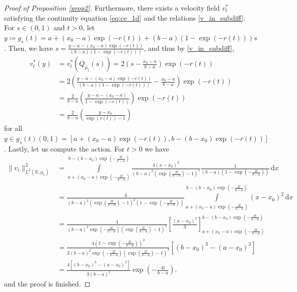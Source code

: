 \documentclass{article}
\newcommand{\R}{\mathbb{R}}
\renewcommand{\d}{\, \mathrm{d}}
\theoremstyle{plain}
\theoremstyle{definition}
\theoremstyle{remark}
\begin{document}
\begin{proof}[Proof of Proposition \ref{prop2}]
Furthermore, there exists a velocity field $v_t^*$ satisfying the continuity equation \eqref{eq:ce_1d} and the relations \eqref{v_in_subdiff}.
For $s \in (0, 1)$ and $t > 0$, let $y \coloneqq g_s(t) = a + (x_0 - a) \exp\left( - r(t)\right) + (b - a) \left(1 - \exp\left( - r(t)\right)\right) s$.
Then, we have $s = \frac{y - a - (x_0 - a) \exp\left( - r(t)\right)}{(b - a) \left(1 -\exp\left( - r(t)\right)\right)}$, and thus by \eqref{v_in_subdiff},
    \begin{align*}
        v_t^*(y)
        & = v_t^*(Q_{\mu_t}(s))
        = 2 \left(s - \frac{x_0 - a}{b - a} \right)\exp\left( - r(t)\right) \\
        & = 2 \left(\frac{y - a - (x_0 - a) \exp\left( - r(t)\right)}{(b - a) \left(1 -\exp\left( - r(t)\right)\right)} - \frac{x_0 - a}{b - a} \right)\exp\left( - r(t)\right) \\
        & = \frac{2}{b - a} \left(\frac{y - a - (x_0 - a)}{1 -\exp\left( - r(t)\right)} \right)\exp\left( - r(t)\right) \\
        & = \frac{2}{b - a} \left(\frac{y - x_0}{\exp\left(r(t)\right) - 1} \right) 
    \end{align*}
    for all $y \in g_s(t)(0,1) = \left[ a + (x_0 - a) \exp(-r(t)), b - (b - x_0) \exp\left(- r(t) \right) \right]$. 
    Lastly, let us compute the action.
    For $t > 0$ we have
    \begin{align}
        \| v_t \|_{L^2(\R,\mu_t)}^2
        & = \int\limits_{a + (x_0 - a) \exp\left( - \frac{2 t}{b - a}\right)}^{b - (b - x_0) \exp\left( - \frac{2 t}{b - a}\right)} \frac{4 (x - x_0)^2}{(b - a)^2 \left( \exp\left(\frac{2 t}{b - a}\right) - 1\right)^2} \frac{1}{(b - a) \left(1 - \exp\left(-\frac{2 t}{b - a}\right)\right)} \d{x} \\
        & = \frac{4}{(b - a)^3 \left( \exp\left(\frac{2 t}{b - a}\right) - 1\right)^2 \left(1 - \exp\left(-\frac{2 t}{b - a}\right)\right)} \int\limits_{a + (x_0 - a) \exp\left( - \frac{2 t}{b - a}\right)}^{b - (b - x_0) \exp\left( - \frac{2 t}{b - a}\right)} (x - x_0)^2 \d{x} \\
        & = \frac{4}{(b - a)^2 \exp\left(-\frac{2 t}{b - a}\right) \left(\exp\left(\frac{2 t}{b - a}\right) - 1\right)^3} \left[ \frac{(x - x_0)^3}{3} \right]_{a + (x_0 - a) \exp\left( - \frac{2 t}{b - a}\right)}^{b - (b - x_0) \exp\left( - \frac{2 t}{b - a}\right)} \\
        & = \frac{4 \left(1 - \exp\left( - \frac{2 t}{b - a}\right)\right)^3}{3 (b - a)^2 \exp\left(-\frac{2 t}{b - a}\right) \left(\exp\left(\frac{2 t}{b - a}\right) - 1\right)^3} \left[ (b - x_0)^3 - (a - x_0)^3 \right] \\
        & = \frac{4 \left[ (b - x_0)^3 - (a - x_0)^3 \right]}{3 (b - a)^2} \exp\left( - \frac{4 t}{b - a}\right).
    \end{align}
    and the proof is finished.
\end{proof}
\end{document}
